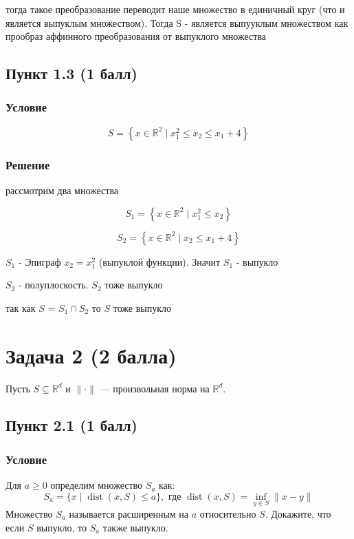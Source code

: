 \documentclass[10pt]{article}
\begin{document}
тогда такое преобразование переводит наше множество в единичный круг (что и является выпуклым множеством). Тогда S - является выпууклым множеством как прообраз аффинного преобразования от выпуклого множества

\subsection{Пункт 1.3 (1 балл)}
\subsubsection{Условие}

\[
S=\left\{x \in \mathbb{R}^{2} \mid x_{1}^{2} \leq x_{2} \leq x_{1}+4\right\}
\]

\subsubsection{Решение}

рассмотрим два множества

\[
S_1=\left\{x \in \mathbb{R}^{2} \mid x_{1}^{2} \leq x_{2} \right\}
\]

\[
S_2=\left\{x \in \mathbb{R}^{2} \mid x_{2} \leq x_{1}+4\right\}
\]

$S_1$ - Эпиграф $x_2 = x_1^2$ (выпуклой функции). Значит $S_1$ - выпукло

$S_2$ - полуплоскость. $S_2$ тоже выпукло

так как $S$ = $S_1 \cap S_2$ то $S$ тоже выпукло




\section{Задача 2 (2 балла)}
Пусть $S \subseteq \mathbb{R}^{d}$ и $\|\cdot\|$ — произвольная норма на $\mathbb{R}^{d}$.

\subsection{Пункт 2.1 (1 балл)}
\subsubsection{Условие}

Для $a \geq 0$ определим множество $S_{a}$ как:
\[
S_{a}=\{x \mid \operatorname{dist}(x, S) \leq a\}, \text{ где } \operatorname{dist}(x, S)=\inf_{y \in S}\|x-y\|
\]
Множество $S_{a}$ называется расширенным на $a$ относительно $S$. Докажите, что если $S$ выпукло, то $S_{a}$ также выпукло.
\end{document}
